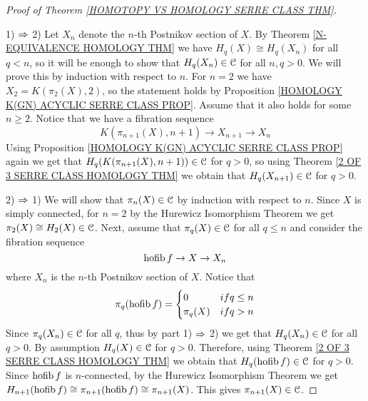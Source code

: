 \begin{proof}[Proof of Theorem \ref{HOMOTOPY VS HOMOLOGY SERRE CLASS THM}]\ 

1) $\Rightarrow$ 2) Let $X_{n}$ denote the $n$-th  Postnikov section of $X$. 
By Theorem \ref{N-EQUIVALENCE HOMOLOGY THM} we have $H_{q}(X)\cong H_{q}(X_{n})$
for all $q< n$, so it will be enough to show that $H_{q}(X_{n})\in {\mathcal C}$ for all
$n, q > 0$. We will prove this by induction with respect to $n$.  For $n=2$ we have 
$X_{2} = K(\pi_{2}(X), 2)$, so the statement holds by 
Proposition \ref{HOMOLOGY K(GN) ACYCLIC SERRE CLASS PROP}. Assume that it also holds 
for some $n\geq 2$. Notice that we have a fibration sequence 
\[
K(\pi_{n+1}(X), n+1) \to X_{n+1} \to X_{n}
\]
Using Proposition \ref{HOMOLOGY K(GN) ACYCLIC SERRE CLASS PROP} again we get 
that $H_{q}(K(\pi_{n+1}(X), n+1) ) \in {\mathcal C}$ for $q>0$, so using 
Theorem \ref{2 OF 3 SERRE CLASS HOMOLOGY THM} we obtain that $H_{q}(X_{n+1}) \in {\mathcal C}$
for $q>0$. 

2) $\Rightarrow$ 1) We will show that $\pi_{n}(X)\in {\mathcal C}$ by induction with respect to $n$. 
Since $X$ is simply connected, for $n=2$ by the Hurewicz Isomorphism Theorem we
get  $\pi_{2}(X) \cong H_{2}(X) \in {\mathcal C}$. Next, assume that $\pi_{q}(X)\in {\mathcal C}$
for all $q\leq n$ and consider the fibration sequence 
\[
\operatorname{hofib} f \to X \to X_{n}
\]
where $X_{n}$ is the $n$-th Postnikov section of $X$.  Notice that
\[
\pi_{q}(\operatorname{hofib} f) = 
\begin{cases}
0 & { if } q\leq n \\
\pi_{q}(X) & { if } q > n \\
\end{cases}
\]
Since $\pi_{q}(X_{n})\in {\mathcal C}$ for all $q$, thus by part 1) $\Rightarrow$ 2) we get that 
$H_{q}(X_{n})\in {\mathcal C}$ for all $q>0$. By assumption $H_{q}(X)\in {\mathcal C}$
for $q>0$. Therefore, using Theorem \ref{2 OF 3 SERRE CLASS HOMOLOGY THM} we obtain 
that $H_{q}(\operatorname{hofib} f)\in {\mathcal C}$ for $q>0$. Since  $\operatorname{hofib} f$ is $n$-connected, 
by the Hurewicz Isomorphism Theorem we get 
$H_{n+1}(\operatorname{hofib} f)\cong \pi_{n+1}(\operatorname{hofib} f) \cong \pi_{n+1}(X)$. This gives 
$\pi_{n+1}(X)\in {\mathcal C}$.



\end{proof}





